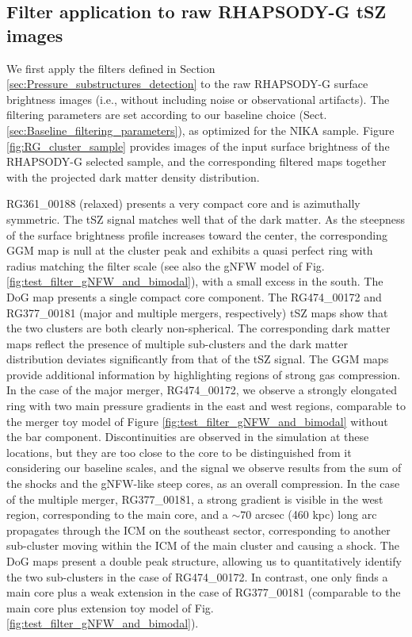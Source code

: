 \documentclass[traditabstract]{aa}
\begin{document}
\subsection{Filter application to raw RHAPSODY-G tSZ images}
We first apply the filters defined in Section \ref{sec:Pressure_substructures_detection} to the raw RHAPSODY-G surface brightness images (i.e., without including noise or observational artifacts). The filtering parameters are set according to our baseline choice (Sect. \ref{sec:Baseline_filtering_parameters}), as optimized for the NIKA sample. Figure \ref{fig:RG_cluster_sample} provides images of the input surface brightness of the RHAPSODY-G selected sample, and the corresponding filtered maps together with the projected dark matter density distribution. 

RG361\_00188 (relaxed) presents a very compact core and is azimuthally symmetric. The tSZ signal matches well that of the dark matter. As the steepness of the surface brightness profile increases toward the center, the corresponding GGM map is null at the cluster peak and exhibits a quasi perfect ring with radius matching the filter scale (see also the gNFW model of Fig. \ref{fig:test_filter_gNFW_and_bimodal}), with a small excess in the south. The DoG map presents a single compact core component. The RG474\_00172 and RG377\_00181 (major and multiple mergers, respectively) tSZ maps show that the two clusters are both clearly non-spherical. The corresponding dark matter maps reflect the presence of multiple sub-clusters and the dark matter distribution deviates significantly from that of the tSZ signal. The GGM maps provide additional information by highlighting regions of strong gas compression. In the case of the major merger, RG474\_00172, we observe a strongly elongated ring with two main pressure gradients in the east and west regions, comparable to the merger toy model of Figure \ref{fig:test_filter_gNFW_and_bimodal} without the bar component. Discontinuities are observed in the simulation at these locations, but they are too close to the core to be distinguished from it considering our baseline scales, and the signal we observe results from the sum of the shocks and the gNFW-like steep cores, as an overall compression. In the case of the multiple merger, RG377\_00181, a strong gradient is visible in the west region, corresponding to the main core, and a $\sim 70$ arcsec (460 kpc) long arc propagates through the ICM on the southeast sector, corresponding to another sub-cluster moving within the ICM of the main cluster and causing a shock. The DoG maps present a double peak structure, allowing us to quantitatively identify the two sub-clusters in the case of RG474\_00172. In contrast, one only finds a main core plus a weak extension in the case of RG377\_00181 (comparable to the main core plus extension toy model of Fig. \ref{fig:test_filter_gNFW_and_bimodal}). 
\end{document}
